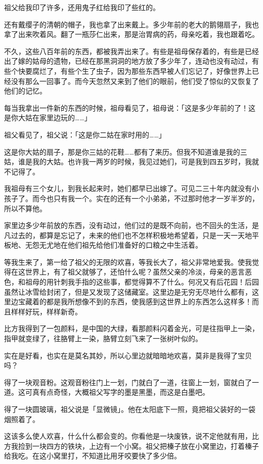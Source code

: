 \documentclass[UTF8]{ctexart}
\begin{document}
祖父给我印了许多，还用鬼子红给我印了些红的。

还有戴缨子的清朝的帽子，我也拿了出来戴上。多少年前的老大的鹅翎扇子，我也拿了出来吹着风。翻了一瓶莎仁出来，那是治胃病的药，母亲吃着，我也跟着吃。

不久，这些八百年前的东西，都被我弄出来了。有些是祖母保存着的，有些是已经出了嫁的姑母的遗物，已经在那黑洞洞的地方放了多少年了，连动也没有动过，有些个快要腐烂了，有些个生了虫子，因为那些东西早被人们忘记了，好像世界上已经没有那么一回事了。而今天忽然又来到了他们的眼前，他们受了惊似的又恢复了他们的记忆。

每当我拿出一件新的东西的时候，祖母看见了，祖母说：「这是多少年前的了！这是你大姑在家里边玩的……」

祖父看见了，祖父说：「这是你二姑在家时用的……」

这是你大姑的扇子，那是你三姑的花鞋……都有了来历。但我不知道谁是我的三姑，谁是我的大姑。也许我一两岁的时候，我见过她们，可是我到四五岁时，我就不记得了。

我祖母有三个女儿，到我长起来时，她们都早已出嫁了。可见二三十年内就没有小孩子了。而今也只有我一个。实在的还有一个小弟弟，不过那时他才一岁半岁的，所以不算他。

家里边多少年前放的东西，没有动过，他们过的是既不向前，也不回头的生活，是凡过去的，都算是忘记了，未来的他们也不怎样积极地希望着，只是一天一天地平板地、无怨无尤地在他们祖先给他们准备好的口粮之中生活着。

等我生来了，第一给了祖父的无限的欢喜，等我长大了，祖父非常地爱我。使我觉得在这世界上，有了祖父就够了，还怕什么呢？虽然父亲的冷淡，母亲的恶言恶色，和祖母的用针刺我手指的这些事，都觉得算不了什么。何况又有后花园！后园虽然让冰雪给封闭了，但是又发现了这储藏室。这里边是无穷无尽地什么都有，这里边宝藏着的都是我所想像不到的东西，使我感到这世界上的东西怎么这样多！而且样样好玩，样样新奇。

比方我得到了一包颜料，是中国的大绿，看那颜料闪着金光，可是往指甲上一染，指甲就变绿了，往胳臂上一染，胳臂立刻飞来了一张树叶似的。

实在是好看，也实在是莫名其妙，所以心里边就暗暗地欢喜，莫非是我得了宝贝吗？

得了一块观音粉。这观音粉往门上一划，门就白了一道，往窗上一划，窗就白了一道。这可真有点奇怪，大概祖父写字的墨是黑墨，而这是白墨吧。

得了一块圆玻璃，祖父说是「显微镜」。他在太阳底下一照，竟把祖父装好的一袋烟照着了。

这该多么使人欢喜，什么什么都会变的。你看他是一块废铁，说不定他就有用，比方我捡到一块四方的铁块，上边有一个小窝。祖父把榛子放在小窝里边，打着榛子给我吃。在这小窝里打，不知道比用牙咬要快了多少倍。
\end{document}
